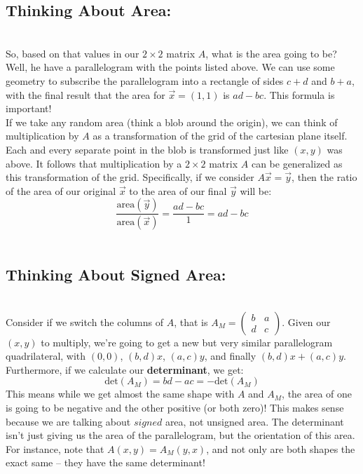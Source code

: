 \documentclass[12pt]{amsart}
\begin{document}
\subsection*{Thinking About Area:}\hfill\\
So, based on that values in our $2\times2$ matrix $A$, what is the area going to be? Well, he have a parallelogram with the points listed above. We can use some geometry to subscribe the parallelogram into a rectangle of sides $c+d$ and $b+a$, with the final result that the area for $\vec{x}=(1,1)$ is $ad-bc$. This formula is important!\\
If we take any random area (think a blob around the origin), we can think of multiplication by $A$ as a transformation of the grid of the cartesian plane itself. Each and every separate point in the blob is transformed just like $(x,y)$ was above. It follows that multiplication by a $2\times2$ matrix $A$ can be generalized as this transformation of the grid. Specifically, if we consider $A\vec{x}=\vec{y}$, then the ratio of the area of our original $\vec{x}$ to the area of our final $\vec{y}$ will be:
\[\frac{\mathrm{area}(\vec{y})}{\mathrm{area}(\vec{x})} = \frac{ad-bc}{1} = ad-bc\]
\\
\subsection*{Thinking About Signed Area:}\hfill\\
Consider if we switch the columns of $A$, that is $A_M=\begin{pmatrix}b&a\\d&c\end{pmatrix}$. Given our $(x,y)$ to multiply, we're going to get a new but very similar parallelogram quadrilateral, with $(0,0)$, $(b,d)x$, $(a,c)y$, and finally $(b,d)x+(a,c)y$. Furthermore, if we calculate our \textbf{determinant}, we get: 
	\[\mathrm{det}(A_M) = bd-ac = -\mathrm{det}(A_M)\]
This means while we get almost the same shape with $A$ and $A_M$, the area of one is going to be negative and the other positive (or both zero)! This makes sense because we are talking about $signed$ area, not unsigned area. The determinant isn't just giving us the area of the parallelogram, but the orientation of this area. For instance, note that $A(x,y)=A_M(y,x)$, and not only are both shapes the exact same -- they have the same determinant!\\
\end{document}
